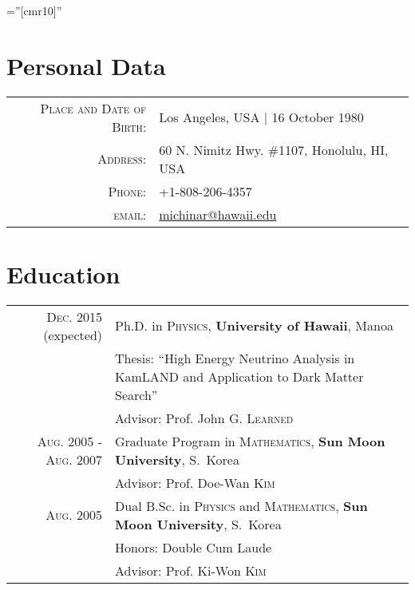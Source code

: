 \documentclass[a4paper,10pt]{article} %
\begin{document}
\pagestyle{empty} %

\font\fb=''[cmr10]'' %


\par{\bigskip\par} %

\section{Personal Data}

\begin{tabular}{rl}
\textsc{Place and Date of Birth:} & Los Angeles, USA  | 16 October 1980\\
\textsc{Address:} & 60 N. Nimitz Hwy. \#1107, Honolulu, HI, USA\\
\textsc{Phone:} & +1-808-206-4357\\
\textsc{email:} & \href{mailto:michinar@hawaii.edu}{michinar@hawaii.edu}
\end{tabular}


\section{Education}

\begin{tabular}{rp{10.3cm}}	
	\textsc{Dec.} 2015 (expected) & Ph.D. in \textsc{Physics},
	\textbf{University of Hawaii}, Manoa\\
	& \small Thesis: ``High Energy Neutrino Analysis in KamLAND and Application
	to Dark Matter Search''\\
	& \small Advisor: Prof. John G. \textsc{Learned}\\


	\textsc{Aug.} 2005 - \textsc{Aug.} 2007 & Graduate Program in
	\textsc{Mathematics}, \normalsize\textbf{Sun Moon University}, S.~Korea\\
	& \small Advisor: Prof. Doe-Wan \textsc{Kim}\\


	\textsc{Aug.} 2005 & Dual B.Sc. in \textsc{Physics} and
	\textsc{Mathematics}, \textbf{Sun Moon University}, S.~Korea\\
	& \small Honors: Double Cum Laude\\
	& \small Advisor: Prof. Ki-Won \textsc{Kim}\\


\end{tabular}
\end{document}
